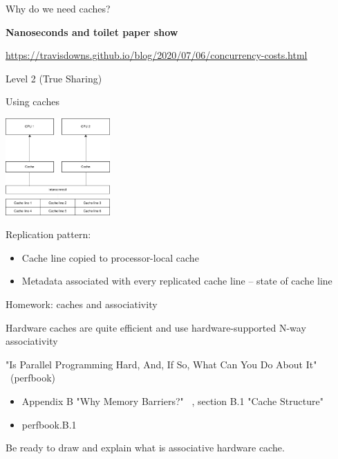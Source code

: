\begin{frame}{Why do we need caches?}

\pause

\begin{center}
    \textbf{Nanoseconds and toilet paper show}
\end{center}

\pause

\begin{center}
   \url{https://travisdowns.github.io/blog/2020/07/06/concurrency-costs.html}

   Level 2 (True Sharing)
\end{center}


\end{frame}


\begin{frame}{Using caches}

\begin{center}
  \includegraphics[width=0.3\textwidth]{./pics/processor/cache.png}
\end{center}

Replication pattern:
\begin{itemize}
    \item Cache line copied to processor-local cache
    \item Metadata associated with every replicated cache line -- state of cache line
\end{itemize}
\end{frame}

\begin{frame}{Homework: caches and associativity}

Hardware caches are quite efficient and use hardware-supported N-way associativity

"Is Parallel Programming Hard, And, If So, What Can You Do About It" \ (perfbook) 
\begin{itemize}
    \item Appendix B "Why Memory Barriers?" \ , section B.1 "Cache Structure"
    \item perfbook.B.1
\end{itemize}

Be ready to draw and explain what is associative hardware cache.

\end{frame}

